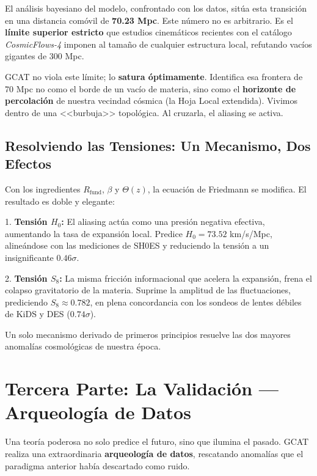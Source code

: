 \documentclass[12pt, a4paper]{article}
\begin{document}
El análisis bayesiano del modelo, confrontado con los datos, sitúa esta transición en una distancia comóvil de \textbf{70.23 Mpc}. Este número no es arbitrario. Es el \textbf{límite superior estricto} que estudios cinemáticos recientes con el catálogo \textit{CosmicFlows-4} imponen al tamaño de cualquier estructura local, refutando vacíos gigantes de 300 Mpc.

GCAT no viola este límite; lo \textbf{satura óptimamente}. Identifica esa frontera de 70 Mpc no como el borde de un vacío de materia, sino como el \textbf{horizonte de percolación} de nuestra vecindad cósmica (la Hoja Local extendida). Vivimos dentro de una <<burbuja>> topológica. Al cruzarla, el aliasing se activa.

\subsection{Resolviendo las Tensiones: Un Mecanismo, Dos Efectos}

Con los ingredientes $R_{\text{fund}}$, $\beta$ y $\Theta(z)$, la ecuación de Friedmann se modifica. El resultado es doble y elegante:

1.  \textbf{Tensión $H_0$:} El aliasing actúa como una presión negativa efectiva, aumentando la tasa de expansión local. Predice $H_0 = 73.52$ km/s/Mpc, alineándose con las mediciones de SH0ES y reduciendo la tensión a un insignificante $0.46\sigma$.

2.  \textbf{Tensión $S_8$:} La misma fricción informacional que acelera la expansión, frena el colapso gravitatorio de la materia. Suprime la amplitud de las fluctuaciones, prediciendo $S_8 \approx 0.782$, en plena concordancia con los sondeos de lentes débiles de KiDS y DES ($0.74\sigma$).

Un solo mecanismo derivado de primeros principios resuelve las dos mayores anomalías cosmológicas de nuestra época.

\section{Tercera Parte: La Validación — Arqueología de Datos}

Una teoría poderosa no solo predice el futuro, sino que ilumina el pasado. GCAT realiza una extraordinaria \textbf{arqueología de datos}, rescatando anomalías que el paradigma anterior había descartado como ruido.
\end{document}
